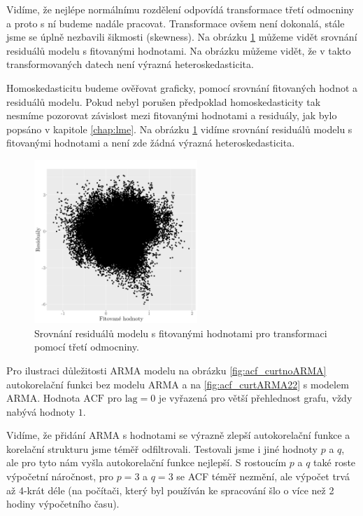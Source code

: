 Vidíme, že nejlépe normálnímu rozdělení odpovídá transformace třetí odmocniny a proto s ní budeme nadále pracovat. Transformace ovšem není dokonalá, stále jsme se úplně nezbavili šikmosti (skewness). Na obrázku \ref{fig:resvsfit_curt} můžeme vidět srovnání residuálů modelu s fitovanými hodnotami. Na obrázku můžeme vidět, že v takto transformovaných datech není výrazná heteroskedasticita.

Homoskedasticitu budeme ověřovat graficky, pomocí srovnání fitovaných hodnot a residuálů modelu. Pokud nebyl porušen předpoklad homoskedasticity tak nesmíme pozorovat závislost mezi fitovanými hodnotami a residuály, jak bylo popsáno v kapitole \ref{chap:lme}. Na obrázku \ref{fig:resvsfit_curt} vidíme srovnání residuálů modelu s fitovanými hodnotami a není zde žádná výrazná heteroskedasticita.

\begin{figure}
	\centering
  \includegraphics[width=0.55\textwidth]{img/ch2/modmax15cm_curt.png}
	\caption{Srovnání residuálů modelu s fitovanými hodnotami pro transformaci pomocí třetí odmocniny.}
	\label{fig:resvsfit_curt}
\end{figure}

Pro ilustraci důležitosti ARMA modelu na obrázku \ref{fig:acf_curtnoARMA} autokorelační funkci bez modelu ARMA a na \ref{fig:acf_curtARMA22} s modelem ARMA. Hodnota $\text{ACF}$ pro $\text{lag}=0$ je vyřazená pro větší přehlednost grafu, vždy nabývá hodnoty $1$.

Vidíme, že přidání ARMA s hodnotami se výrazně zlepší autokorelační funkce a korelační strukturu jsme téměř odfiltrovali. Testovali jsme i jiné hodnoty $p$ a $q$, ale pro tyto nám vyšla autokorelační funkce nejlepší. S rostoucím $p$ a $q$ také roste výpočetní náročnost, pro $p=3$ a $q=3$ se ACF téměř nezmění, ale výpočet trvá až 4-krát déle (na počítači, který byl používán ke spracování šlo o více než 2 hodiny výpočetního času).

